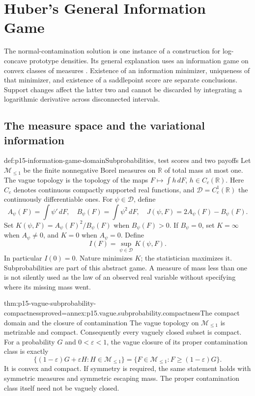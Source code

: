 \chapter{Huber's General Information Game}
\label{sec:p15-huber-information-game}

The normal-contamination solution is one instance of a construction
for log-concave prototype densities. Its general explanation uses an
information game on convex classes of measures
\cite[Secs.~5 and 8]{Huber1964RobustLocation}.
Existence of an information minimizer, uniqueness of that minimizer,
and existence of a saddlepoint score are separate conclusions.
Support changes affect the latter two and cannot be discarded by
integrating a logarithmic derivative across disconnected intervals.

\section{The measure space and the variational information}
\label{sec:p15-information-game-foundations}

\begin{hbdefinition}{def:p15-information-game-domain}{Subprobabilities, test scores and two payoffs}
Let \(\mathcal M_{\leq1}\) be the finite nonnegative Borel measures
on \(\mathbb R\) of total mass at most one.
The vague topology is the topology of the maps
\(F\mapsto\int h\,dF\), \(h\in C_c(\mathbb R)\).
Here \(C_c\) denotes continuous compactly supported real functions,
and \(\mathcal D=C_c^1(\mathbb R)\) the continuously differentiable ones.
For \(\psi\in\mathcal D\), define
\[
 A_\psi(F)=\int\psi'\,dF,\quad B_\psi(F)=\int\psi^2\,dF,\quad
 J(\psi,F)=2A_\psi(F)-B_\psi(F).
\]
Set \(K(\psi,F)=A_\psi(F)^2/B_\psi(F)\) when \(B_\psi(F)>0\).
If \(B_\psi=0\), set \(K=\infty\) when \(A_\psi\ne0\), and \(K=0\)
when \(A_\psi=0\). Define
\[
 I(F)=\sup_{\psi\in\mathcal D}K(\psi,F).
\]
In particular \(I(0)=0\).
Nature minimizes \(K\); the statistician maximizes it.
Subprobabilities are part of this abstract game. A measure of mass
less than one is not silently used as the law of an observed real
variable without specifying where its missing mass went.
\end{hbdefinition}

\begin{hbtheorem}{thm:p15-vague-subprobability-compactness}{proved=annex:p15.vague.subprobability.compactness}{The compact domain and the closure of contamination}
The vague topology on \(\mathcal M_{\leq1}\) is metrizable and compact.
Consequently every vaguely closed subset is compact.
For a probability \(G\) and \(0<\varepsilon<1\), the vague closure
of its proper contamination class is exactly
\[
 \{(1-\varepsilon)G+\varepsilon H:H\in\mathcal M_{\leq1}\}
 =\{F\in\mathcal M_{\leq1}:F\geq(1-\varepsilon)G\}.
\]
It is convex and compact. If symmetry is required, the same statement
holds with symmetric measures and symmetric escaping mass.
The proper contamination class itself need not be vaguely closed.
\end{hbtheorem}

